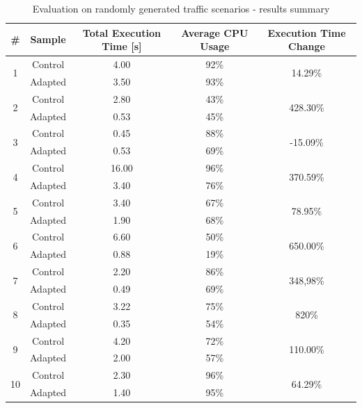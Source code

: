 \documentclass[12pt,a4paper]{article}
\begin{document}
{\renewcommand{\arraystretch}{1.4}
\begin{table}[ht]
\begin{center}
\begin{tabular}{c c | c | c | c}
                 \textbf{\#} & \textbf{Sample} &  \textbf{Total Execution Time [s]} & \textbf{Average CPU Usage} & \textbf{Execution Time Change} \\ \hline 
 \multirow{2}{*}{1} & Control&     4.00          &     92\%   & \multirow{2}{*}{14.29\%} \\ 	  
                    & Adapted&     3.50          &     93\%   & \\ \hline
 \multirow{2}{*}{2} & Control&     2.80          &     43\%   & \multirow{2}{*}{428.30\%}\\ 	  
                    & Adapted&     0.53          &     45\%   & \\ \hline 
 \multirow{2}{*}{3} & Control&     0.45          &     88\%   & \multirow{2}{*}{-15.09\%}\\ 	  
                    & Adapted&     0.53          &     69\%   & \\ \hline 
 \multirow{2}{*}{4} & Control&     16.00         &     96\%   & \multirow{2}{*}{370.59\%}\\ 	  
                    & Adapted&     3.40          &     76\%   & \\ \hline 
 \multirow{2}{*}{5} & Control&     3.40          &     67\%   & \multirow{2}{*}{78.95\%}\\ 	  
                    & Adapted&     1.90          &     68\%   & \\ \hline
 \multirow{2}{*}{6} & Control&     6.60          &     50\%   & \multirow{2}{*}{650.00\%}\\ 	  
                    & Adapted&     0.88          &     19\%   & \\ \hline
 \multirow{2}{*}{7} & Control&     2.20          &     86\%   & \multirow{2}{*}{348,98\%}\\	  
                    & Adapted&     0.49          &     69\%   & \\ \hline 
 \multirow{2}{*}{8} & Control&     3.22          &     75\%   & \multirow{2}{*}{820\%}\\  
                    & Adapted&     0.35          &     54\%   & \\ \hline 
 \multirow{2}{*}{9} & Control&     4.20          &     72\%   & \multirow{2}{*}{110.00\%}\\  
                    & Adapted&     2.00          &     57\%   & \\ \hline 
 \multirow{2}{*}{10}& Control&     2.30          &     96\%   & \multirow{2}{*}{64.29\%}\\ 	  
                    & Adapted&     1.40          &     95\%   \\         
\end{tabular}
\end{center}
\caption{Evaluation on randomly generated traffic scenarios - results summary}
\label{table:random:resultssummary}
\end{table}
}
\end{document}
